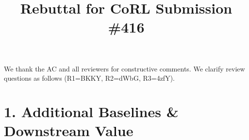 \documentclass[conference]{IEEEtran}
\begin{document}
\small

\title{Rebuttal for CoRL Submission \#416\vspace{-0.9cm}}
\maketitle
\thispagestyle{empty}
\vspace{-0.15cm}

{\small We thank the AC and all reviewers for constructive comments.
We clarify review questions as follows (R1=BKKY, R2=dWbG, R3=4zfY). }

\section*{1. Additional Baselines \& Downstream Value}

\end{document}
